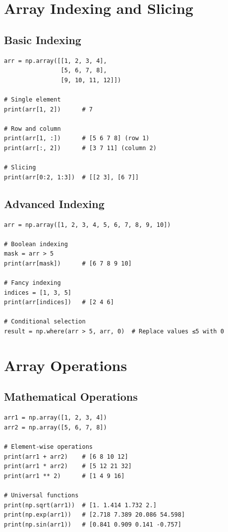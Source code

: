 \documentclass[12pt,a4paper]{article}
\begin{document}
\section{Array Indexing and Slicing}

\subsection{Basic Indexing}

\begin{lstlisting}
arr = np.array([[1, 2, 3, 4],
                [5, 6, 7, 8],
                [9, 10, 11, 12]])

# Single element
print(arr[1, 2])      # 7

# Row and column
print(arr[1, :])      # [5 6 7 8] (row 1)
print(arr[:, 2])      # [3 7 11] (column 2)

# Slicing
print(arr[0:2, 1:3])  # [[2 3], [6 7]]
\end{lstlisting}

\subsection{Advanced Indexing}

\begin{lstlisting}
arr = np.array([1, 2, 3, 4, 5, 6, 7, 8, 9, 10])

# Boolean indexing
mask = arr > 5
print(arr[mask])      # [6 7 8 9 10]

# Fancy indexing
indices = [1, 3, 5]
print(arr[indices])   # [2 4 6]

# Conditional selection
result = np.where(arr > 5, arr, 0)  # Replace values ≤5 with 0
\end{lstlisting}

\section{Array Operations}

\subsection{Mathematical Operations}

\begin{lstlisting}
arr1 = np.array([1, 2, 3, 4])
arr2 = np.array([5, 6, 7, 8])

# Element-wise operations
print(arr1 + arr2)    # [6 8 10 12]
print(arr1 * arr2)    # [5 12 21 32]
print(arr1 ** 2)      # [1 4 9 16]

# Universal functions
print(np.sqrt(arr1))  # [1. 1.414 1.732 2.]
print(np.exp(arr1))   # [2.718 7.389 20.086 54.598]
print(np.sin(arr1))   # [0.841 0.909 0.141 -0.757]
\end{lstlisting}
\end{document}
